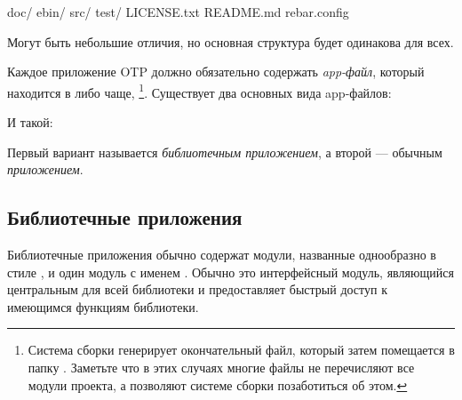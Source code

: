 \begin{VerbatimRaw}
doc/
ebin/
src/
test/
LICENSE.txt
README.md
rebar.config
\end{VerbatimRaw}

Могут быть небольшие отличия, но основная структура будет одинакова для всех.

Каждое приложение OTP должно обязательно содержать \emph{app-файл}, который находится в  либо чаще, \footnote{Система сборки генерирует окончательный файл, который затем помещается в папку . Заметьте что в этих случаях многие файлы   не перечисляют все модули проекта, а позволяют системе сборки позаботиться об этом.}. Существует два основных вида app-файлов:


И такой:


Первый вариант называется \emph{библиотечным приложением}, а второй --- обычным \emph{приложением}.


\subsection{Библиотечные приложения}
\label{subsec:dive-library-applications}

Библиотечные приложения обычно содержат модули, названные однообразно в стиле , и один модуль с именем . Обычно это интерфейсный модуль, являющийся центральным для всей библиотеки и предоставляет быстрый доступ к имеющимся функциям библиотеки.

